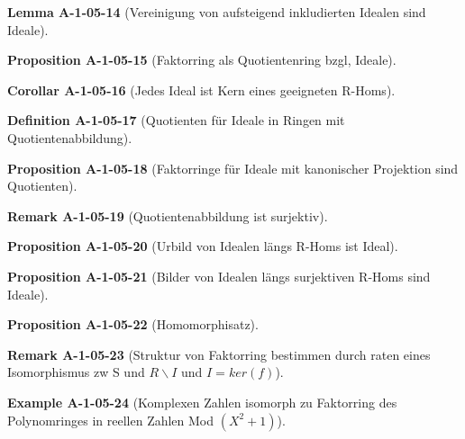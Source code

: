 \documentclass[10pt, letterpaper]{article}
\newcommand{\CustomHeading}[3]{%
  \par\medskip\noindent%
  \textbf{#1 #2} \textnormal{(#3)}.\enskip%
}
\newenvironment{DEF}[2]{\CustomHeading{Definition}{#1}{#2}}{}
\newenvironment{PROP}[2]{\CustomHeading{Proposition}{#1}{#2}}{}
\newenvironment{LEM}[2]{\CustomHeading{Lemma}{#1}{#2}}{}
\newenvironment{KORO}[2]{\CustomHeading{Corollar}{#1}{#2}}{}
\newenvironment{REM}[2]{\CustomHeading{Remark}{#1}{#2}}{}
\newenvironment{EXA}[2]{\CustomHeading{Example}{#1}{#2}}{}
\begin{document}
\begin{LEM}{A-1-05-14}{Vereinigung von aufsteigend inkludierten Idealen sind Ideale}
\end{LEM}

\begin{PROP}{A-1-05-15}{Faktorring als Quotientenring bzgl, Ideale}
\end{PROP}

\begin{KORO}{A-1-05-16}{Jedes Ideal ist Kern eines geeigneten R-Homs}
\end{KORO}

\begin{DEF}{A-1-05-17}{Quotienten für Ideale in Ringen mit Quotientenabbildung}
\end{DEF}

\begin{PROP}{A-1-05-18}{Faktorringe für Ideale mit kanonischer Projektion sind Quotienten}
\end{PROP}

\begin{REM}{A-1-05-19}{Quotientenabbildung ist surjektiv}
\end{REM}

\begin{PROP}{A-1-05-20}{Urbild von Idealen längs R-Homs ist Ideal}
\end{PROP}

\begin{PROP}{A-1-05-21}{Bilder von Idealen längs surjektiven R-Homs sind Ideale}
\end{PROP}

\begin{PROP}{A-1-05-22}{Homomorphisatz}
\end{PROP}

\begin{REM}{A-1-05-23}{Struktur von Faktorring bestimmen durch raten eines Isomorphismus zw S und $R\backslash I$ und $I=ker(f)$}
\end{REM}

\begin{EXA}{A-1-05-24}{Komplexen Zahlen isomorph zu Faktorring des Polynomringes in reellen Zahlen Mod $(X^2+1)$}
\end{EXA}
\end{document}
